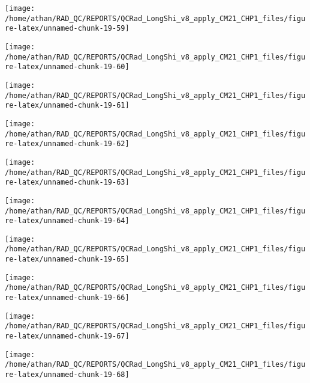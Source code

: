 \documentclass[
  10pt,
  a4paper,oneside]{article}
\begin{document}
\begin{center}\texttt{[image: /home/athan/RAD\_QC/REPORTS/QCRad\_LongShi\_v8\_apply\_CM21\_CHP1\_files/figure-latex/unnamed-chunk-19-59]} \end{center}

\begin{center}\texttt{[image: /home/athan/RAD\_QC/REPORTS/QCRad\_LongShi\_v8\_apply\_CM21\_CHP1\_files/figure-latex/unnamed-chunk-19-60]} \end{center}

\begin{center}\texttt{[image: /home/athan/RAD\_QC/REPORTS/QCRad\_LongShi\_v8\_apply\_CM21\_CHP1\_files/figure-latex/unnamed-chunk-19-61]} \end{center}

\begin{center}\texttt{[image: /home/athan/RAD\_QC/REPORTS/QCRad\_LongShi\_v8\_apply\_CM21\_CHP1\_files/figure-latex/unnamed-chunk-19-62]} \end{center}

\begin{center}\texttt{[image: /home/athan/RAD\_QC/REPORTS/QCRad\_LongShi\_v8\_apply\_CM21\_CHP1\_files/figure-latex/unnamed-chunk-19-63]} \end{center}

\begin{center}\texttt{[image: /home/athan/RAD\_QC/REPORTS/QCRad\_LongShi\_v8\_apply\_CM21\_CHP1\_files/figure-latex/unnamed-chunk-19-64]} \end{center}

\begin{center}\texttt{[image: /home/athan/RAD\_QC/REPORTS/QCRad\_LongShi\_v8\_apply\_CM21\_CHP1\_files/figure-latex/unnamed-chunk-19-65]} \end{center}

\begin{center}\texttt{[image: /home/athan/RAD\_QC/REPORTS/QCRad\_LongShi\_v8\_apply\_CM21\_CHP1\_files/figure-latex/unnamed-chunk-19-66]} \end{center}

\begin{center}\texttt{[image: /home/athan/RAD\_QC/REPORTS/QCRad\_LongShi\_v8\_apply\_CM21\_CHP1\_files/figure-latex/unnamed-chunk-19-67]} \end{center}

\begin{center}\texttt{[image: /home/athan/RAD\_QC/REPORTS/QCRad\_LongShi\_v8\_apply\_CM21\_CHP1\_files/figure-latex/unnamed-chunk-19-68]} \end{center}
\end{document}
